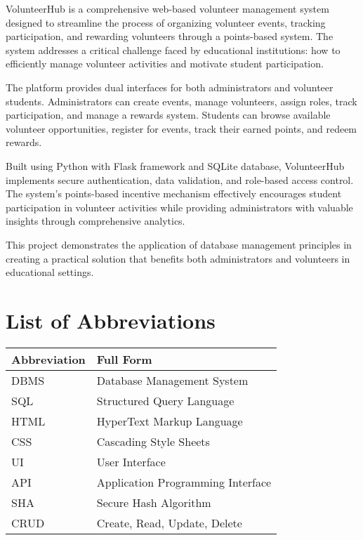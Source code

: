 \documentclass[12pt,a4paper]{report}
\begin{document}
VolunteerHub is a comprehensive web-based volunteer management system designed to streamline the process of organizing volunteer events, tracking participation, and rewarding volunteers through a points-based system. The system addresses a critical challenge faced by educational institutions: how to efficiently manage volunteer activities and motivate student participation.

The platform provides dual interfaces for both administrators and volunteer students. Administrators can create events, manage volunteers, assign roles, track participation, and manage a rewards system. Students can browse available volunteer opportunities, register for events, track their earned points, and redeem rewards.

Built using Python with Flask framework and SQLite database, VolunteerHub implements secure authentication, data validation, and role-based access control. The system's points-based incentive mechanism effectively encourages student participation in volunteer activities while providing administrators with valuable insights through comprehensive analytics.

This project demonstrates the application of database management principles in creating a practical solution that benefits both administrators and volunteers in educational settings.

\cleardoublepage

\tableofcontents
\cleardoublepage

\listoffigures
\cleardoublepage

\listoftables
\cleardoublepage

\chapter*{List of Abbreviations}

\begin{tabular}{ll}
\textbf{Abbreviation} & \textbf{Full Form} \\
\hline
DBMS & Database Management System \\
SQL & Structured Query Language \\
HTML & HyperText Markup Language \\
CSS & Cascading Style Sheets \\
UI & User Interface \\
API & Application Programming Interface \\
SHA & Secure Hash Algorithm \\
CRUD & Create, Read, Update, Delete \\
\end{tabular}
\end{document}
